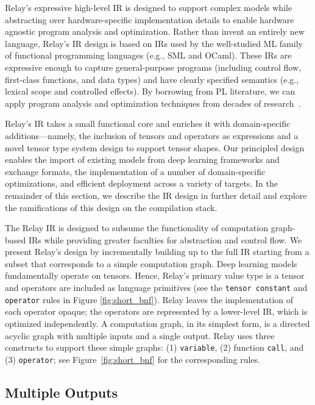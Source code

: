 Relay's expressive high-level IR is designed to support
  complex models while abstracting over hardware-specific
  implementation details to enable hardware agnostic program
  analysis and optimization.
Rather than invent an entirely new language,
  Relay's IR design is based on IRs used by the well-studied ML family of
  functional programming languages (e.g., SML and OCaml).
These IRs are expressive enough to capture general-purpose programs
  (including control flow, first-class functions, and data types)
  and have clearly specified semantics (e.g., lexical scope and controlled effects).
By borrowing from PL literature,
  we can apply program analysis and optimization techniques from decades of research~\citep{haskell_vector}.

Relay's IR takes a small functional core and enriches it with domain-specific additions---namely,
  the inclusion of tensors and operators as expressions
  and a novel tensor type system design to support tensor shapes.
Our principled design
  enables the import of existing models from deep learning frameworks and exchange formats,
  the implementation of a number of domain-specific optimizations,
  and efficient deployment across a variety of targets.
In the remainder of this section,
  we describe the IR design in further detail
  and explore the ramifications of this design on the compilation stack.

The Relay IR is designed
  to subsume the functionality of computation graph-based IRs
  while providing greater faculties for abstraction and control flow.
We present Relay's design by incrementally building up to the full IR
  starting from a subset that corresponds to a simple computation graph.
Deep learning models fundamentally operate on tensors.
Hence, Relay's primary value type is a tensor and operators are included as language primitives
  (see the \verb|tensor constant| and \verb|operator| rules in Figure \ref{fig:short_bnf}).
Relay leaves the implementation of each operator opaque; the operators
  are represented by a lower-level IR, which is optimized independently.
A computation graph, in its simplest form, is a directed acyclic
  graph with multiple inputs and a single output.
Relay uses three constructs to support these simple graphs:
  (1) \verb|variable|, (2) function \verb|call|,
  and (3) \verb|operator|; see Figure~\ref{fig:short_bnf} for the corresponding rules.

\subsection*{Multiple Outputs}

